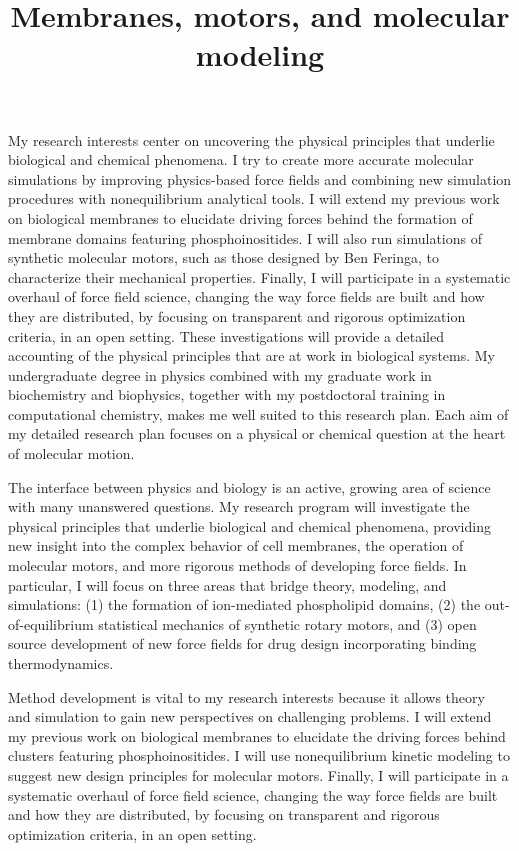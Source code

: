 \documentclass[11pt,notitlepage]{article}
\title{\large \vspace{-0.75in} \textbf{Membranes, motors, and molecular modeling} \vspace{-1in} }
\date{}
\begin{document}

\maketitle
\thispagestyle{title}


My research interests center on uncovering the physical principles that
underlie biological and chemical phenomena. I try to create more
accurate molecular simulations by improving physics-based force fields
and combining new simulation procedures with nonequilibrium analytical
tools. I will extend my previous work on biological membranes to
elucidate driving forces behind the formation of membrane domains
featuring phosphoinositides. I will also run simulations of synthetic
molecular motors, such as those designed by Ben Feringa, to characterize
their mechanical properties. Finally, I will participate in a systematic
overhaul of force field science, changing the way force fields are built
and how they are distributed, by focusing on transparent and rigorous
optimization criteria, in an open setting. These investigations will
provide a detailed accounting of the physical principles that are at
work in biological systems. My undergraduate degree in physics combined
with my graduate work in biochemistry and biophysics, together with my
postdoctoral training in computational chemistry, makes me well suited
to this research plan. Each aim of my detailed research plan focuses on
a physical or chemical question at the heart of molecular motion.

The interface between physics and biology is an active, growing area of
science with many unanswered questions. My research program will
investigate the physical principles that underlie biological and
chemical phenomena, providing new insight into the complex behavior of
cell membranes, the operation of molecular motors, and more rigorous
methods of developing force fields. In particular, I will focus on three
areas that bridge theory, modeling, and simulations: (1) the formation
of ion-mediated phospholipid domains, (2) the out-of-equilibrium
statistical mechanics of synthetic rotary motors, and (3) open source
development of new force fields for drug design incorporating binding
thermodynamics.

Method development is vital to my research interests because it allows
theory and simulation to gain new perspectives on challenging problems.
I will extend my previous work on biological membranes to elucidate the
driving forces behind clusters featuring phosphoinositides. I will use
nonequilibrium kinetic modeling to suggest new design principles for
molecular motors. Finally, I will participate in a systematic overhaul
of force field science, changing the way force fields are built and how
they are distributed, by focusing on transparent and rigorous
optimization criteria, in an open setting.
\end{document}
